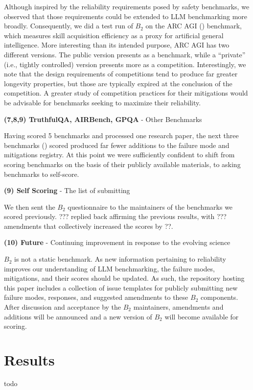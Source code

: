 \documentclass{article}
\newcommand\bb{$B_2$ }
\begin{document}
Although inspired by the reliability requirements posed by safety benchmarks, we observed that those requirements could be extended to LLM benchmarking more broadly. Consequently, we did a test run of \bb on the ARC AGI (\cite{chollet2024arc}) benchmark, which measures skill acquisition efficiency as a proxy for artificial general intelligence. More interesting than its intended purpose, ARC AGI has two different versions. The public version presents as a benchmark, while a ``private'' (i.e., tightly controlled) version presents more as a competition. Interestingly, we note that the design requirements of competitions tend to produce far greater longevity properties, but those are typically expired at the conclusion of the competition. A greater study of competition practices for their mitigations would be advisable for benchmarks seeking to maximize their reliability.

\textbf{(7,8,9) TruthfulQA, AIRBench, GPQA} - Other Benchmarks

Having scored 5 benchmarks and processed one research paper, the next three benchmarks (\cite{lin2021truthfulqa,zeng2024air,rein2023gpqa}) scored produced far fewer additions to the failure mode and mitigations registry. At this point we were sufficiently confident to shift from scoring benchmarks on the basis of their publicly available materials, to asking benchmarks to self-score.

\textbf{(9) Self Scoring} - The list of submitting

We then sent the \bb questionnaire to the maintainers of the benchmarks we scored previously. ??? replied back affirming the previous results, with ??? amendments that collectively increased the scores by ??.

\textbf{(10) Future} - Continuing improvement in response to the evolving science

\bb is not a static benchmark. As new information pertaining to reliability improves our understanding of LLM benchmarking, the failure modes, mitigations, and their scores should be updated. As such, the repository hosting this paper includes a collection of issue templates for publicly submitting new failure modes, responses, and suggested amendments to these \bb components. After discussion and acceptance by the \bb maintainers, amendments and additions will be announced and a new version of \bb will become available for scoring.

\section{Results}
todo
\end{document}
